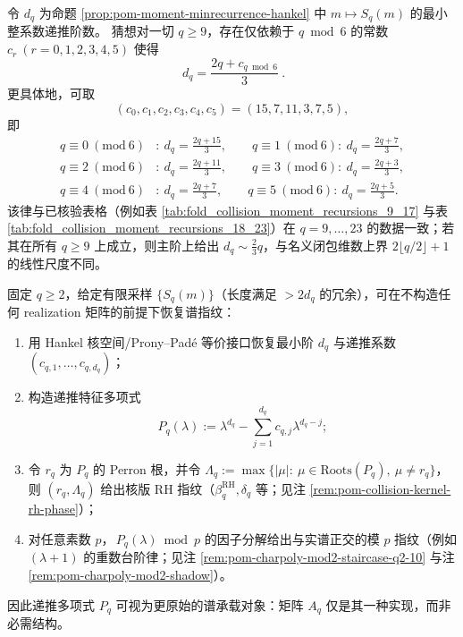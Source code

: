 \begin{conjecture}\label{conj:pom-moment-order-two-thirds-slope-affine-6period}
令 \(d_q\) 为命题 \ref{prop:pom-moment-minrecurrence-hankel} 中 \(m\mapsto S_q(m)\) 的最小整系数递推阶数。
猜想对一切 \(q\ge 9\)，存在仅依赖于 \(q\bmod 6\) 的常数 \(c_r\ (r=0,1,2,3,4,5)\) 使得
\[
\boxed{\ d_q=\frac{2q+c_{q\bmod 6}}{3}\ }.
\]
更具体地，可取
\[
(c_0,c_1,c_2,c_3,c_4,c_5)=(15,7,11,3,7,5),
\]
即
\[
\begin{aligned}
q\equiv 0\ (\mathrm{mod}\ 6)&:\ d_q=\frac{2q+15}{3},\qquad
q\equiv 1\ (\mathrm{mod}\ 6):\ d_q=\frac{2q+7}{3},\\
q\equiv 2\ (\mathrm{mod}\ 6)&:\ d_q=\frac{2q+11}{3},\qquad
q\equiv 3\ (\mathrm{mod}\ 6):\ d_q=\frac{2q+3}{3},\\
q\equiv 4\ (\mathrm{mod}\ 6)&:\ d_q=\frac{2q+7}{3},\qquad
q\equiv 5\ (\mathrm{mod}\ 6):\ d_q=\frac{2q+5}{3}.
\end{aligned}
\]
该律与已核验表格（例如表 \ref{tab:fold_collision_moment_recursions_9_17} 与表 \ref{tab:fold_collision_moment_recursions_18_23}）在 \(q=9,\dots,23\) 的数据一致；若其在所有 \(q\ge 9\) 上成立，则主阶上给出
\(
d_q\sim \frac{2}{3}q
\)，与名义闭包维数上界 \(2\lfloor q/2\rfloor+1\) 的线性尺度不同。
\end{conjecture}

\begin{algorithm}\label{alg:pom-recurrence-polynomial-spectral-extraction}
固定 \(q\ge 2\)，给定有限采样 \(\{S_q(m)\}\)（长度满足 \(>\!2d_q\) 的冗余），可在不构造任何 realization 矩阵的前提下恢复谱指纹：
\begin{enumerate}
  \item 用 Hankel 核空间/Prony--Pad\'e 等价接口恢复最小阶 \(d_q\) 与递推系数 \((c_{q,1},\dots,c_{q,d_q})\)；
  \item 构造递推特征多项式
  \[
  P_q(\lambda):=\lambda^{d_q}-\sum_{j=1}^{d_q}c_{q,j}\lambda^{d_q-j};
  \]
  \item 令 \(r_q\) 为 \(P_q\) 的 Perron 根，并令
  \(
  \Lambda_q:=\max\{|\mu|:\ \mu\in\mathrm{Roots}(P_q),\ \mu\ne r_q\}
  \)，则 \((r_q,\Lambda_q)\) 给出核版 RH 指纹（\(\beta^{\mathrm{RH}}_q,\delta_q\) 等；见注 \ref{rem:pom-collision-kernel-rh-phase}）；
  \item 对任意素数 \(p\)，\(\,P_q(\lambda)\bmod p\) 的因子分解给出与实谱正交的模 \(p\) 指纹（例如 \((\lambda+1)\) 的重数台阶律；见注 \ref{rem:pom-charpoly-mod2-staircase-q2-10} 与注 \ref{rem:pom-charpoly-mod2-shadow}）。
\end{enumerate}
因此递推多项式 \(P_q\) 可视为更原始的谱承载对象：矩阵 \(A_q\) 仅是其一种实现，而非必需结构。
\end{algorithm}

